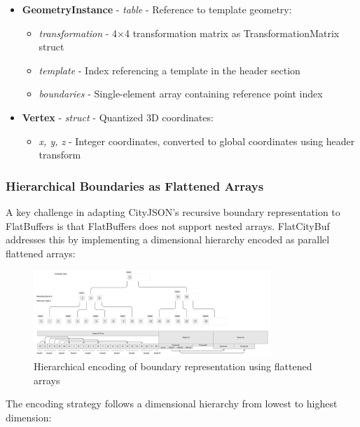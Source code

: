 \begin{itemize}
  \item \textbf{GeometryInstance} - \textit{table} - Reference to template geometry:
    \begin{itemize}
      \item \textit{transformation} - 4×4 transformation matrix as TransformationMatrix struct
      \item \textit{template} - Index referencing a template in the header section
      \item \textit{boundaries} - Single-element array containing reference point index
    \end{itemize}

  \item \textbf{Vertex} - \textit{struct} - Quantized 3D coordinates:
    \begin{itemize}
      \item \textit{x, y, z} - Integer coordinates, converted to global coordinates using header transform
    \end{itemize}
\end{itemize}

\subsubsection{Hierarchical Boundaries as Flattened Arrays}
\label{methodology:feature_encoding:geometry_encoding:flattened_arrays}

A key challenge in adapting CityJSON's recursive boundary representation to FlatBuffers is that FlatBuffers does not support nested arrays. FlatCityBuf addresses this by implementing a dimensional hierarchy encoded as parallel flattened arrays:

\begin{figure}[htbp]
  \centering
  \includegraphics[width=0.8\textwidth]{figs/methodology/attribute_index.png}
  \caption{Hierarchical encoding of boundary representation using flattened arrays}
  \label{fig:methodology:boundary_encoding}
\end{figure}

The encoding strategy follows a dimensional hierarchy from lowest to highest dimension:

